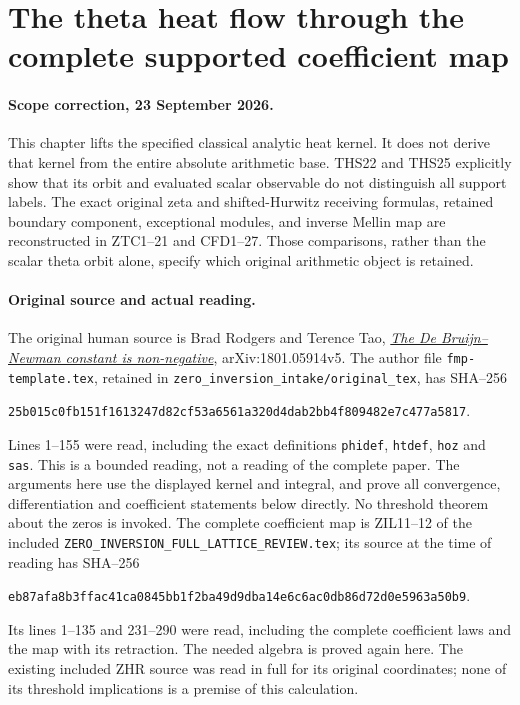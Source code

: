 \section{The theta heat flow through the complete supported coefficient map}
\label{sec:theta-heat-full-support}

\paragraph{Scope correction, 23 September 2026.}
This chapter lifts the specified classical analytic heat kernel. It does
not derive that kernel from the entire absolute arithmetic base.
THS22 and THS25 explicitly show that its orbit and evaluated scalar
observable do not distinguish all support labels. The exact original
zeta and shifted-Hurwitz receiving formulas, retained boundary component,
exceptional modules, and inverse Mellin map are reconstructed in
ZTC1--21 and CFD1--27. Those comparisons, rather than the scalar
theta orbit alone, specify which original arithmetic object is retained.

\paragraph{Original source and actual reading.}
The original human source is Brad Rodgers and Terence Tao,
\href{https://arxiv.org/abs/1801.05914v5}{\emph{The De Bruijn--Newman
constant is non-negative}}, arXiv:1801.05914v5. The author file
\nolinkurl{fmp-template.tex}, retained in
\texttt{zero\_inversion\_intake/original\_tex}, has SHA--256
\begin{center}\small
\nolinkurl{25b015c0fb151f1613247d82cf53a6561a320d4dab2bb4f809482e7c477a5817}.
\end{center}
Lines 1--155 were read, including the exact definitions
\texttt{phidef}, \texttt{htdef}, \texttt{hoz} and \texttt{sas}.
This is a bounded reading, not a reading of the complete paper.
The arguments here use the displayed kernel and integral, and prove
all convergence, differentiation and coefficient statements below
directly. No threshold theorem about the zeros is invoked.
The complete coefficient map is ZIL11--12 of the included
\nolinkurl{ZERO_INVERSION_FULL_LATTICE_REVIEW.tex}; its source at
the time of reading has SHA--256
\begin{center}\small
\nolinkurl{eb87afa8b3ffac41ca0845bb1f2ba49d9dba14e6c6ac0db86d72d0e5963a50b9}.
\end{center}
Its lines 1--135 and 231--290 were read, including the complete
coefficient laws and the map with its retraction. The needed algebra
is proved again here. The existing included ZHR source was read in
full for its original coordinates; none of its threshold implications
is a premise of this calculation.

